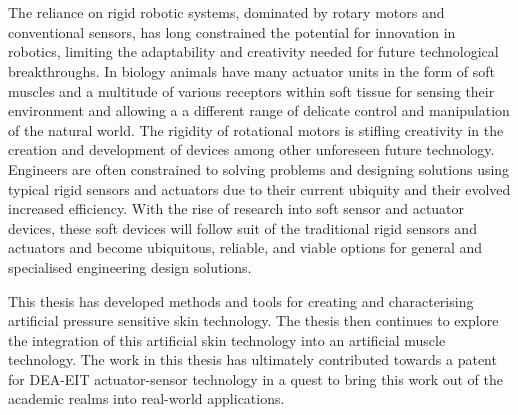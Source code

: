 \chapter{\chapiname}
\label{chapter1}
The reliance on rigid robotic systems, dominated by rotary motors and conventional sensors, has long constrained the potential for innovation in robotics, limiting the adaptability and creativity needed for future technological breakthroughs. In biology animals have many actuator units in the form of soft muscles and a multitude of various receptors within soft tissue for sensing their environment and allowing a a different range of delicate control and manipulation of the natural world. The rigidity of rotational motors is stifling creativity in the creation and development of devices among other unforeseen future technology. Engineers are often constrained to solving problems and designing solutions using typical rigid sensors and actuators due to their current ubiquity and their evolved increased efficiency. With the rise of research into soft sensor and actuator devices, these soft devices will follow suit of the traditional rigid sensors and actuators and become ubiquitous, reliable, and viable options for general and specialised engineering design solutions. 

This thesis has developed methods and tools for creating and characterising artificial pressure sensitive skin technology. The thesis then continues to explore the integration of this artificial skin technology into an artificial muscle technology. The work in this thesis has ultimately contributed towards a patent for DEA-EIT actuator-sensor technology in a quest to bring this work out of the academic realms into real-world applications.



